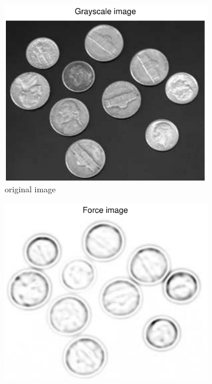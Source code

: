 \documentclass[11pt,a4paper]{article}
\begin{document}
\begin{figure}[H]
    \centering
    \begin{subfigure}[t]{0.24\textwidth}
        \includegraphics[width=\textwidth]{src/images/coins_log_gray.pdf}
        \caption{original image}
        \label{fig:coins_log_original}
    \end{subfigure}
    \begin{subfigure}[t]{0.24\textwidth}
        \includegraphics[width=\textwidth]{src/images/coins_log_forces.pdf}

\end{subfigure}
\end{figure}
\end{document}
